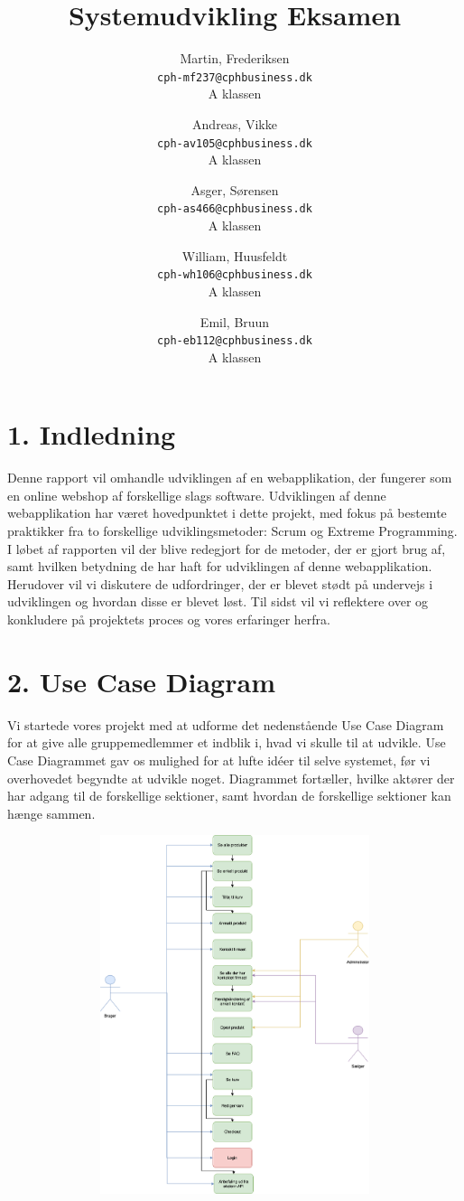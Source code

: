 \documentclass[11pt]{report}
\title{Systemudvikling Eksamen}
\author{
  Martin, Frederiksen\\
  \texttt{cph-mf237@cphbusiness.dk}\\
  A klassen
  \and
  Andreas, Vikke\\
  \texttt{cph-av105@cphbusiness.dk}\\
  A klassen
  \and
  Asger, Sørensen\\
  \texttt{cph-as466@cphbusiness.dk}\\
  A klassen
  \and
  William, Huusfeldt\\
  \texttt{cph-wh106@cphbusiness.dk}\\
  A klassen
  \and
  Emil, Bruun\\
  \texttt{cph-eb112@cphbusiness.dk}\\
  A klassen
}
\date{}
\begin{document}
\maketitle

\renewcommand{\cftchapleader}{\cftdotfill{\cftdotsep}}
\tableofcontents
\newpage

\chapter*{1. Indledning}
Denne rapport vil omhandle udviklingen af en webapplikation, der fungerer som en online webshop af forskellige slags software. Udviklingen af denne webapplikation har været hovedpunktet i dette projekt, med fokus på bestemte praktikker fra to forskellige udviklingsmetoder: Scrum og Extreme Programming. I løbet af rapporten vil der blive redegjort for de metoder, der er gjort brug af, samt hvilken betydning de har haft for udviklingen af denne webapplikation. Herudover vil vi diskutere de udfordringer, der er blevet stødt på undervejs i udviklingen og hvordan disse er blevet løst. Til sidst vil vi reflektere over og konkludere på projektets proces og vores erfaringer herfra.


\chapter*{2. Use Case Diagram}
Vi startede vores projekt med at udforme det nedenstående Use Case Diagram for at give alle gruppemedlemmer et indblik i, hvad vi skulle til at udvikle. Use Case Diagrammet gav os mulighed for at lufte idéer til selve systemet, før vi overhovedet begyndte at udvikle noget. Diagrammet fortæller, hvilke aktører der har adgang til de forskellige sektioner, samt hvordan de forskellige sektioner kan hænge sammen.

\begin{center}
\includegraphics[height=10.5cm, width=15cm]{UseCaseDiagram}
\end{center}
\end{document}
